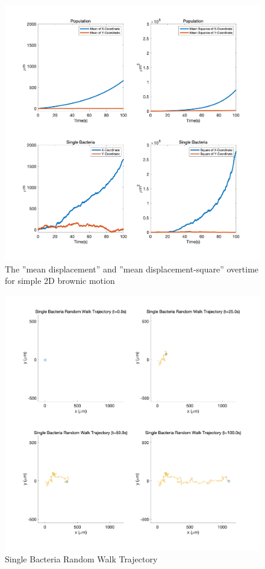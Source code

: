 \begin{figure}[H]
\centering
\includegraphics[width=1\linewidth]{Figures/P2_fig2.png}
\caption{The ”mean displacement” and ”mean displacement-square” overtime for simple 2D brownic motion}
\label{P2_fig2}
\end{figure}


\begin{figure}[H]
\centering
\includegraphics[width=1\linewidth]{Figures/P2_fig3.png}
\caption{Single Bacteria Random Walk Trajectory}
\label{P2_fig3}
\end{figure}


